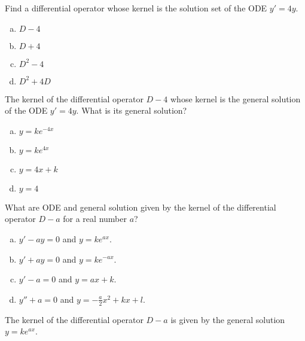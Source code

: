\begin{applicationActivities}
\begin{activity}{5}
Find a differential operator whose kernel is the solution set of the ODE \(y'=4y\).
\begin{enumerate}[a)]
\item \(D-4\)
\item \(D+4\)
\item \(D^2-4\)
\item \(D^2+4D\)
\end{enumerate}
\end{activity}

\begin{activity}{5}
The kernel of the differential operator \(D-4\) whose kernel is the general solution of the ODE 
\(y'=4y\). What is its general solution?
\begin{enumerate}[a)]
\item \(y=ke^{-4x}\)
\item \(y=ke^{4x}\)
\item \(y=4x+k\)
\item \(y=4\)
\end{enumerate}
\end{activity}

\begin{activity}{5}
What are ODE and general solution given by the kernel of the differential operator \(D-a\) for a real number \(a\)?
\begin{enumerate}[a)]
\item \(y'-ay=0\) and \(y=ke^{ax}\).
\item \(y'+ay=0\) and \(y=ke^{-ax}\).
\item \(y'-a=0\) and \(y=ax+k\).
\item \(y''+a=0\) and \(y=-\frac{a}{2}x^2+kx+l\).
\end{enumerate}
\end{activity}

\begin{observation}
The kernel of the differential operator \(D-a\) is given by the general solution \(y=ke^{ax}\).
\end{observation}


\end{applicationActivities}
